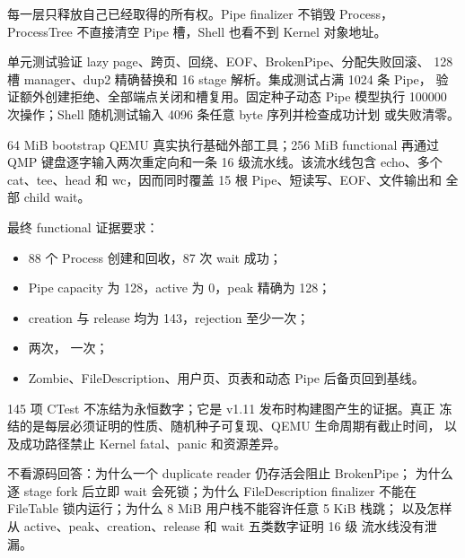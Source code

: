每一层只释放自己已经取得的所有权。Pipe finalizer 不销毁 Process，
ProcessTree 不直接清空 Pipe 槽，Shell 也看不到 Kernel 对象地址。

单元测试验证 lazy page、跨页、回绕、EOF、BrokenPipe、分配失败回滚、
128 槽 manager、dup2 精确替换和 16 stage 解析。集成测试占满 1024 条 Pipe，
验证额外创建拒绝、全部端点关闭和槽复用。固定种子动态 Pipe 模型执行
100000 次操作；Shell 随机测试输入 4096 条任意 byte 序列并检查成功计划
或失败清零。

64 MiB bootstrap QEMU 真实执行基础外部工具；256 MiB functional 再通过
QMP 键盘逐字输入两次重定向和一条 16 级流水线。该流水线包含 echo、多个
cat、tee、head 和 wc，因而同时覆盖 15 根 Pipe、短读写、EOF、文件输出和
全部 child wait。

最终 functional 证据要求：

\begin{itemize}
  \item 88 个 Process 创建和回收，87 次 wait 成功；
  \item Pipe capacity 为 128，active 为 0，peak 精确为 128；
  \item creation 与 release 均为 143，rejection 至少一次；
  \item {} 两次，
         一次；
  \item Zombie、FileDescription、用户页、页表和动态 Pipe 后备页回到基线。
\end{itemize}

145 项 CTest 不冻结为永恒数字；它是 v1.11 发布时构建图产生的证据。真正
冻结的是每层必须证明的性质、随机种子可复现、QEMU 生命周期有截止时间，
以及成功路径禁止 Kernel fatal、panic 和资源差异。

\begin{contractbox}
不看源码回答：为什么一个 duplicate reader 仍存活会阻止 BrokenPipe；
为什么逐 stage fork 后立即 wait 会死锁；为什么 FileDescription finalizer
不能在 FileTable 锁内运行；为什么 8 MiB 用户栈不能容许任意 5 KiB 栈跳；
以及怎样从 active、peak、creation、release 和 wait 五类数字证明 16 级
流水线没有泄漏。
\end{contractbox}

